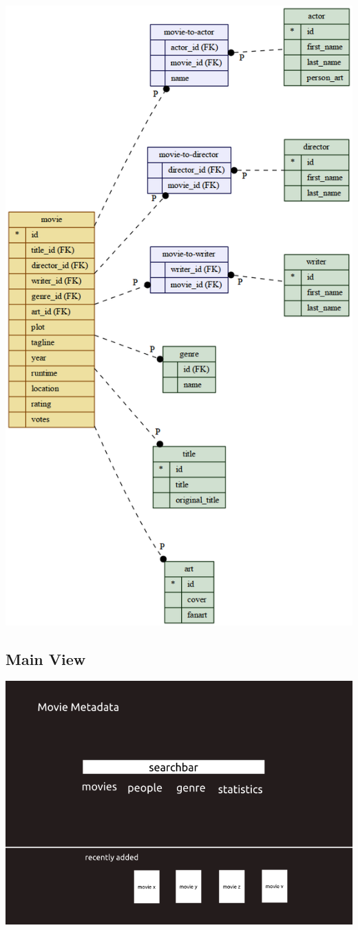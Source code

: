 \documentclass[11pt]{scrreprt}
\begin{document}
\includegraphics[scale=0.5]{../pics/dataschema}


\subsection{Main View}
\includegraphics[width=\textwidth]{../pics/mainview}
\end{document}

